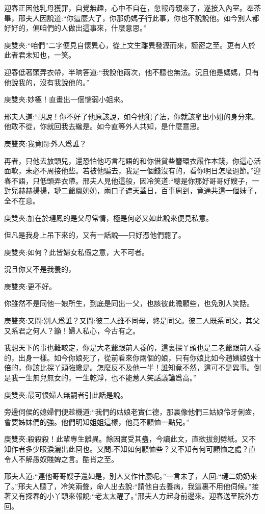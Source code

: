 \begin{parag}
    迎春正因他乳母獲罪，自覺無趣，心中不自在，忽報母親來了，遂接入內室。奉茶畢，邢夫人因說道:“你這麼大了，你那奶媽子行此事，你也不說說他。如今別人都好好的，偏咱們的人做出這事來，什麼意思。”\begin{note}庚雙夾:“咱們”二字便見自懷異心，從上文生離異發瀝而來，謹密之至。更有人於此者君未知也，一笑。\end{note}迎春低著頭弄衣帶，半晌答道:“我說他兩次，他不聽也無法。況且他是媽媽，只有他說我的，沒有我說他的。”\begin{note}庚雙夾:妙極！直畫出一個懦弱小姐來。\end{note}邢夫人道:“胡說！你不好了他原該說，如今他犯了法，你就該拿出小姐的身分來。他敢不從，你就回我去纔是。如今直等外人共知，是什麼意思。\begin{note}庚雙夾:我竟問:外人爲誰？\end{note}再者，只他去放頭兒，還恐怕他巧言花語的和你借貸些簪環衣履作本錢，你這心活面軟，未必不周接他些。若被他騙去，我是一個錢沒有的，看你明日怎麼過節。”迎春不語，只低頭弄衣帶。邢夫人見他這般，因冷笑道:“總是你那好哥哥好嫂子，一對兒赫赫揚揚，璉二爺鳳奶奶，兩口子遮天蓋日，百事周到，竟通共這一個妹子，全不在意。\begin{note}庚雙夾:加在於璉鳳的是父母常情，極是何必又如此說來便見私意。\end{note}但凡是我身上吊下來的，又有一話說──只好憑他們罷了。\begin{note}庚雙夾:如何？此皆婦女私假之意，大不可者。\end{note}況且你又不是我養的，\begin{note}庚雙夾:更不好。\end{note}你雖然不是同他一娘所生，到底是同出一父，也該彼此瞻顧些，也免別人笑話。\begin{note}庚雙夾:又問:別人爲誰？又問:彼二人雖不同母，終是同父。彼二人既系同父，其父又系君之何人？籲！婦人私心，今古有之。\end{note}我想天下的事也難較定，你是大老爺跟前人養的，這裏探丫頭也是二老爺跟前人養的，出身一樣。如今你娘死了，從前看來你兩個的娘，只有你娘比如今趙姨娘強十倍的，你該比探丫頭強纔是。怎麼反不及他一半！誰知竟不然，這可不是異事。倒是我一生無兒無女的，一生乾淨，也不能惹人笑話議論爲高。”\begin{note}庚雙夾:最可恨婦人無嗣者引此話是說。\end{note}旁邊伺侯的媳婦們便趁機道:“我們的姑娘老實仁德，那裏像他們三姑娘伶牙俐齒，會要姊妹們的強。他們明知姐姐這樣，他竟不顧恤一點兒。”\begin{note}庚雙夾:殺殺殺！此輩專生離異。餘因實受其蠱，今讀此文，直欲拔劍劈紙。又不知作者多少眼淚灑出此回也。又問:不知如何顧恤些？又不知有何可顧恤之處？直令人不解愚奴賤婢之言。酷肖之至。\end{note}邢夫人道:“連他哥哥嫂子還如是，別人又作什麼呢。”一言未了，人回:“璉二奶奶來了。”邢夫人聽了，冷笑兩聲，命人出去說:“請他自去養病，我這裏不用他伺候。”接著又有探春的小丫頭來報說:“老太太醒了。”邢夫人方起身前邊來。迎春送至院外方回。
\end{parag}



